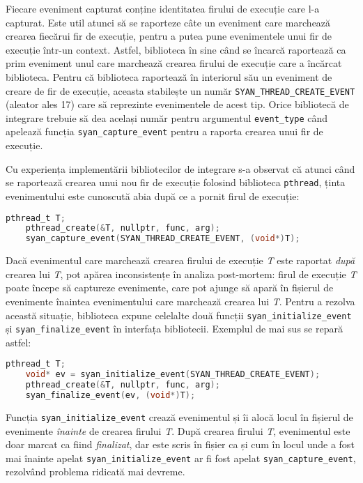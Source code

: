 Fiecare eveniment capturat conține identitatea firului de execuție care
l-a capturat. Este util atunci să se raporteze câte un eveniment care
marchează crearea fiecărui fir de execuție, pentru a putea pune
evenimentele unui fir de execuție într-un context. Astfel, biblioteca în
sine când se încarcă raportează ca prim eveniment unul care marchează
crearea firului de execuție care a încărcat biblioteca. Pentru că
biblioteca raportează în interiorul său un eveniment de creare de fir de
execuție, aceasta stabilește un număr
\lstinline{SYAN_THREAD_CREATE_EVENT} (aleator ales 17) care să
reprezinte evenimentele de acest tip. Orice bibliotecă de integrare
trebuie să dea același număr pentru argumentul \lstinline{event_type}
când apelează funcția \lstinline{syan_capture_event} pentru a raporta
crearea unui fir de execuție.

Cu experiența implementării bibliotecilor de integrare s-a observat că
atunci când se raportează crearea unui nou fir de execuție folosind
biblioteca \lstinline{pthread}, ținta evenimentului este cunoscută abia
după ce a pornit firul de execuție:
\begin{lstlisting}[language=C]
    pthread_t T;
    pthread_create(&T, nullptr, func, arg);
    syan_capture_event(SYAN_THREAD_CREATE_EVENT, (void*)T);
\end{lstlisting}
Dacă evenimentul care marchează crearea firului de execuție \textit{T}
este raportat \textit{după} crearea lui \textit{T}, pot apărea
inconsistențe în analiza post-mortem: firul de execuție \textit{T} poate
începe să captureze evenimente, care pot ajunge să apară în fișierul de
evenimente înaintea evenimentului care marchează crearea lui \textit{T}.
Pentru a rezolva această situație, biblioteca expune celelalte două
funcții \lstinline{syan_initialize_event} și
\lstinline{syan_finalize_event} în interfața bibliotecii. Exemplul de
mai sus se repară astfel:
\begin{lstlisting}[language=C]
    pthread_t T;
    void* ev = syan_initialize_event(SYAN_THREAD_CREATE_EVENT);
    pthread_create(&T, nullptr, func, arg);
    syan_finalize_event(ev, (void*)T);
\end{lstlisting}
Funcția \lstinline{syan_initialize_event} crează evenimentul și îi
alocă locul în fișierul de evenimente \textit{înainte} de crearea
firului \textit{T}. După crearea firului \textit{T}, evenimentul este
doar marcat ca fiind \textit{finalizat}, dar este scris în fișier ca și
cum în locul unde a fost mai înainte apelat
\lstinline{syan_initialize_event} ar fi fost apelat
\lstinline{syan_capture_event}, rezolvând problema ridicată mai devreme.

